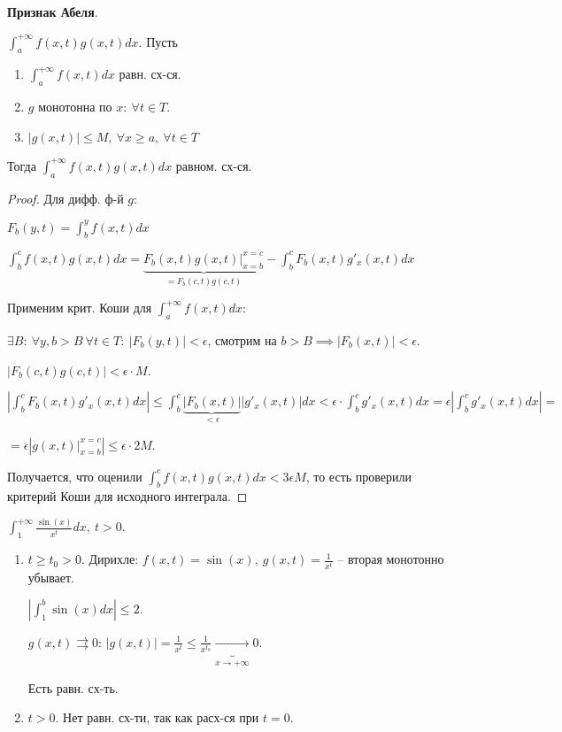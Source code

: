 \begin{theorem}
    \textbf{Признак Абеля}.

    $\int_{a}^{+\infty} { f(x, t) g(x, t) dx }$. Пусть 
    
    \begin{enumerate}
        \item {
            $\int_{a}^{+\infty} { f(x, t) dx }$ равн. сх-ся.
        }
        \item {
            $g$ монотонна по $x: \ \forall t \in T$. 
        }
        \item {
            $| g(x, t) | \leq M, \ \forall x \geq a, \ \forall t \in T$
        }
    \end{enumerate}

    Тогда $\int_{a}^{+\infty} { f(x, t) g(x, t) dx }$ равном. сх-ся.
\end{theorem}
\begin{proof}
    Для дифф. ф-й $g$:

    $F_b (y, t) = \int_{b}^{y} { f(x, t) dx }$

    $\int_{b}^{c} { f(x, t) g(x, t) dx } = \underbrace{F_b (x, t) g(x, t) |_{x=b}^{x=c}}_{= F_b(c, t) g(c, t)} - \int_b^{c} { F_b(x, t) g'_x(x, t) dx }$

    Применим крит. Коши для $\int_{a}^{+\infty} {f(x, t) dx}$:
    
    $\exists B : \ \forall y, b > B \ \forall t \in T: \ \left| F_b(y, t)  \right| < \epsilon$, смотрим на $b > B \implies |F_b(x, t)| < \epsilon$.

    $|F_b(c, t) g(c, t)| < \epsilon \cdot M$.

    $\left| \int_{b}^{c} { F_b(x, t) g'_x(x, t) dx } \right| \leq \int_{b}^{c} { \underbrace{|F_b(x, t)|}_{< \epsilon} |g'_x(x, t)| dx} < \epsilon \cdot \int_{b}^{c} { g'_x(x, t) dx } = \epsilon \left| \int_{b}^{c} { g'_x(x, t) d x } \right| =$
    
    $= \epsilon \left| g(x, t)|_{x=b}^{x=c}  \right| \leq \epsilon \cdot 2 M$.

    Получается, что оценили $\int_{b}^{c} { f(x, t) g(x, t) dx } < 3 \epsilon M$, то есть проверили критерий Коши для исходного интеграла.
\end{proof}
\begin{example}
    $\int_{1}^{+\infty} { \frac{\sin(x)}{x^t} dx }, \ t > 0$.

    \begin{enumerate}
        \item {
            $t \geq t_0 > 0$. Дирихле: $f(x, t) = \sin(x), \ g(x, t) = \frac{1}{x^t}$ -- вторая монотонно убывает.

            $\left| \int_{1}^{b} { \sin(x) dx } \right| \leq 2$.

            $g(x, t) \rightrightarrows 0$: $|g(x, t)| = \frac{1}{x^t} \leq \frac{1}{x^{t_0}} \underbrace{\rightarrow}_{x \rightarrow +\infty} 0$.

            Есть равн. сх-ть.
        }
        \item {
            $t > 0$. Нет равн. сх-ти, так как расх-ся при $t=0$.
        }
    \end{enumerate}
\end{example}


